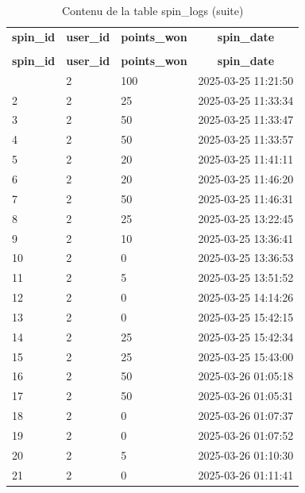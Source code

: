 %
%
 \begin{longtable}{|l|l|l|l|} 
 \hline \endhead \hline \endfoot \hline 
 \caption{Contenu de la table spin\_logs} \label{tab:spin_logs-data} \\\hline \multicolumn{1}{|c|}{\textbf{spin\_id}} & \multicolumn{1}{|c|}{\textbf{user\_id}} & \multicolumn{1}{|c|}{\textbf{points\_won}} & \multicolumn{1}{|c|}{\textbf{spin\_date}} \\ \hline \hline  \endfirsthead 
\caption{Contenu de la table spin\_logs (suite)} \\ \hline \multicolumn{1}{|c|}{\textbf{spin\_id}} & \multicolumn{1}{|c|}{\textbf{user\_id}} & \multicolumn{1}{|c|}{\textbf{points\_won}} & \multicolumn{1}{|c|}{\textbf{spin\_date}} \\ \hline \hline \endhead \endfoot
1 & 2 & 100 & 2025-03-25 11:21:50 \\ \hline 
2 & 2 & 25 & 2025-03-25 11:33:34 \\ \hline 
3 & 2 & 50 & 2025-03-25 11:33:47 \\ \hline 
4 & 2 & 50 & 2025-03-25 11:33:57 \\ \hline 
5 & 2 & 20 & 2025-03-25 11:41:11 \\ \hline 
6 & 2 & 20 & 2025-03-25 11:46:20 \\ \hline 
7 & 2 & 50 & 2025-03-25 11:46:31 \\ \hline 
8 & 2 & 25 & 2025-03-25 13:22:45 \\ \hline 
9 & 2 & 10 & 2025-03-25 13:36:41 \\ \hline 
10 & 2 & 0 & 2025-03-25 13:36:53 \\ \hline 
11 & 2 & 5 & 2025-03-25 13:51:52 \\ \hline 
12 & 2 & 0 & 2025-03-25 14:14:26 \\ \hline 
13 & 2 & 0 & 2025-03-25 15:42:15 \\ \hline 
14 & 2 & 25 & 2025-03-25 15:42:34 \\ \hline 
15 & 2 & 25 & 2025-03-25 15:43:00 \\ \hline 
16 & 2 & 50 & 2025-03-26 01:05:18 \\ \hline 
17 & 2 & 50 & 2025-03-26 01:05:31 \\ \hline 
18 & 2 & 0 & 2025-03-26 01:07:37 \\ \hline 
19 & 2 & 0 & 2025-03-26 01:07:52 \\ \hline 
20 & 2 & 5 & 2025-03-26 01:10:30 \\ \hline 
21 & 2 & 0 & 2025-03-26 01:11:41 \\ \hline 

\end{longtable}
